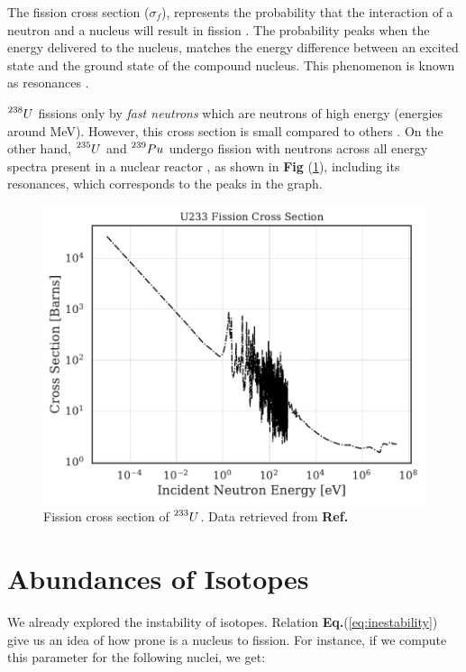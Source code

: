  The fission cross section ($\sigma_{f}$), represents the probability that the interaction of a neutron and a nucleus will result in fission \cite{Stacey_2010}. The probability peaks when the energy delivered to the nucleus, matches the energy difference between an excited state and the ground state of the compound nucleus. This phenomenon is known as resonances \cite{Stacey_2010}. 

$\prescript{238}{}{U}$ fissions only by \textit{fast neutrons} which are neutrons of high energy (energies around MeV). However, this cross section is small compared to others \cite{Notas_sanabricas}. On the other hand, $\prescript{235}{}{U}$ and $\prescript{239}{}{Pu}$ undergo fission with neutrons across all energy spectra present in a nuclear reactor \cite{Notas_sanabricas}, as shown in \textbf{Fig} (\ref{fig:Cross_section_fission}), including its resonances, which corresponds to the peaks in the graph.

\begin{figure}
    \centering
    \includegraphics[width=0.75\linewidth]{Kap2/Figures/U233_Cross_Section.pdf}
    \caption{Fission cross section of $\prescript{233}{}{U}$. Data retrieved from \textbf{Ref.} \cite{NNDC}}
    \label{fig:Cross_section_fission}
\end{figure}

\section{Abundances of Isotopes}
\label{sec:possible_fuels}

We already explored the instability of isotopes. Relation \textbf{Eq.}(\ref{eq:inestability}) give us an idea of how prone is a nucleus to fission. For instance, if we compute this parameter for the following nuclei, we get:

